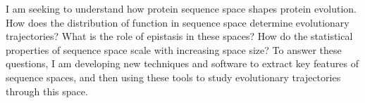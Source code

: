 

\begin{cvparagraph}

I am seeking to understand how protein sequence space shapes protein evolution. How does the distribution of function in sequence space determine evolutionary trajectories? What is the role of epistasis in these spaces? How do the statistical properties of sequence space scale with increasing space size? To answer these questions, I am developing new techniques and software to extract key features of sequence spaces, and then using these tools to study evolutionary trajectories through this space.

\end{cvparagraph}
